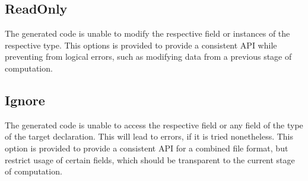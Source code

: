 \subsection*{ReadOnly}
The generated code is unable to modify the respective field or instances of the respective type. This options is provided to provide a consistent API while preventing from logical errors, such as modifying data from a previous stage of computation.

\subsection*{Ignore}
The generated code is unable to access the respective field or any field of the type of the target declaration. This will lead to errors, if it is tried nonetheless. This option is provided to provide a consistent API for a combined file format, but restrict usage of certain fields, which should be transparent to the current stage of computation.
